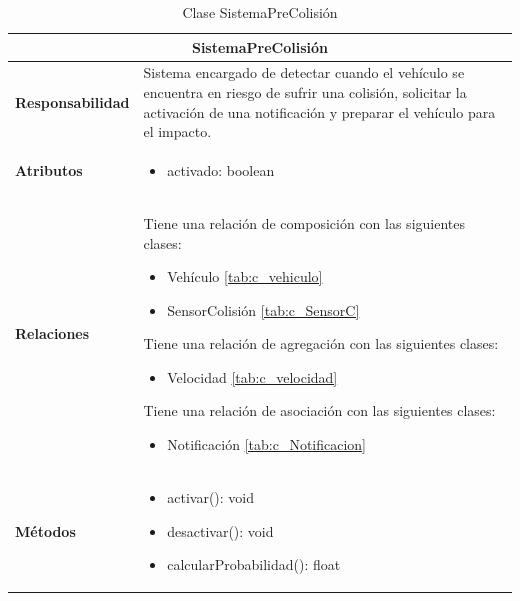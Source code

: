 \begin{table}[H]
\begin{center}
\begin{tabular}{p{} p{11cm}}
\multicolumn{2}{c}{\textbf{SistemaPreColisión} } \\ \hline \hline
\textbf{Responsabilidad} &  Sistema encargado de detectar cuando el vehículo se encuentra en riesgo de sufrir una colisión, solicitar la activación de una notificación y preparar el vehículo para el impacto.  \\ \hline
\textbf{Atributos} & \begin{itemize}
                      \item activado: boolean
                    \end{itemize}\\ \hline
\textbf{Relaciones} & \par Tiene una relación de composición con las siguientes clases:
                      \begin{itemize}
                        \item Vehículo \ref{tab:c_vehiculo}
                        \item SensorColisión \ref{tab:c_SensorC}
                      \end{itemize}

                      \par Tiene una relación de agregación con las siguientes clases:
                      \begin{itemize}
                        \item Velocidad \ref{tab:c_velocidad}
                      \end{itemize}

                      \par Tiene una relación de asociación con las siguientes clases:
                      \begin{itemize}
                        \item Notificación \ref{tab:c_Notificacion}
                      \end{itemize}


                      \\ \hline

\textbf{Métodos} &  \begin{itemize}
                      \item activar(): void
                      \item desactivar(): void
                      \item calcularProbabilidad(): float
                    \end{itemize}\\ \hline
\end{tabular}
\caption{Clase SistemaPreColisión}
\label{tab:c_SPColision}
\end{center}
\end{table}









